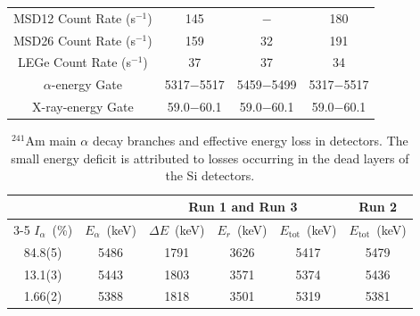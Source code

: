 \documentclass[aps,UTF8,prc,twocolumn,preprintnumbers,amsmath,amssymb,floatfix]{revtex4-2}
\begin{document}
\begin{table}[htbp!]
\begin{center}
\begin{ruledtabular}
\begin{tabular}{cccc}
MSD12 Count Rate (s$^{-1}$) & 145 & $-$ & 180 \\
MSD26 Count Rate (s$^{-1}$) & 159 & 32 & 191 \\
LEGe Count Rate (s$^{-1}$) & 37 & 37 & 34 \\
$\alpha$-energy Gate & 5317$-$5517 & 5459$-$5499 & 5317$-$5517 \\
X-ray-energy Gate & 59.0$-$60.1 & 59.0$-$60.1 & 59.0$-$60.1 \\
\end{tabular}
\end{ruledtabular}
\end{center}
\end{table}


\begin{table}[htbp!]\footnotesize
\caption{\label{Energy_loss} $^{241}$Am main $\alpha$ decay branches and effective energy loss in detectors. The small energy deficit is attributed to losses occurring in the dead layers of the Si detectors.}
\begin{center}
\renewcommand{\arraystretch}{1.1}  %
\begin{ruledtabular}
\begin{tabular}{cccccc}
  &  & \multicolumn{3}{|c|}{Run 1 and Run 3} & \multicolumn{1}{c}{Run 2}  \\
  \cline{3-5}\cline{6-6}
  $I_\alpha$~(\%)\footnotemark[1] & $E_\alpha$~(keV)\footnotemark[1] & \multicolumn{1}{|c}{$\Delta E$~(keV)} & $E_r$~(keV) & \multicolumn{1}{c|}{$E_{\mathrm{tot}}$~(keV)} & $E_{\mathrm{tot}}$~(keV) \\
  \hline
84.8(5) & 5486 & 1791 & 3626 & 5417 & 5479 \\
13.1(3) & 5443 & 1803 & 3571 & 5374 & 5436 \\
1.66(2) & 5388 & 1818 & 3501 & 5319 & 5381 \\
\end{tabular}
\end{ruledtabular}
\end{center}
\end{table}
\end{document}
